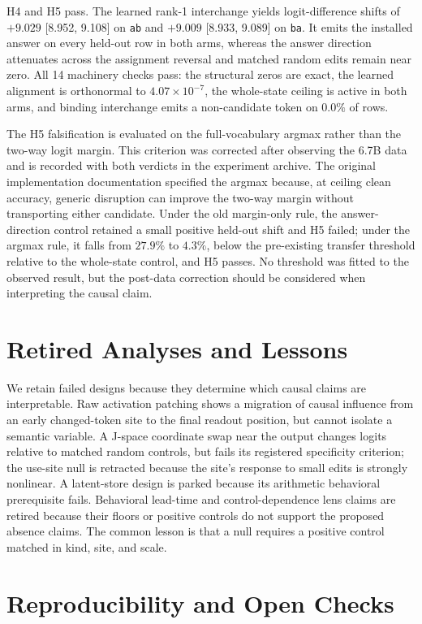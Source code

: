 \documentclass{article}
\begin{document}
H4 and H5 pass. The learned rank-1 interchange yields logit-difference shifts of $+9.029$ [8.952, 9.108] on \texttt{ab} and $+9.009$ [8.933, 9.089] on \texttt{ba}. It emits the installed answer on every held-out row in both arms, whereas the answer direction attenuates across the assignment reversal and matched random edits remain near zero. All 14 machinery checks pass: the structural zeros are exact, the learned alignment is orthonormal to $4.07\times10^{-7}$, the whole-state ceiling is active in both arms, and binding interchange emits a non-candidate token on $0.0\%$ of rows.

The H5 falsification is evaluated on the full-vocabulary argmax rather than the two-way logit margin. This criterion was corrected after observing the 6.7B data and is recorded with both verdicts in the experiment archive. The original implementation documentation specified the argmax because, at ceiling clean accuracy, generic disruption can improve the two-way margin without transporting either candidate. Under the old margin-only rule, the answer-direction control retained a small positive held-out shift and H5 failed; under the argmax rule, it falls from $27.9\%$ to $4.3\%$, below the pre-existing transfer threshold relative to the whole-state control, and H5 passes. No threshold was fitted to the observed result, but the post-data correction should be considered when interpreting the causal claim.

\section{Retired Analyses and Lessons}

We retain failed designs because they determine which causal claims are interpretable. Raw activation patching shows a migration of causal influence from an early changed-token site to the final readout position, but cannot isolate a semantic variable. A J-space coordinate swap near the output changes logits relative to matched random controls, but fails its registered specificity criterion; the use-site null is retracted because the site's response to small edits is strongly nonlinear. A latent-store design is parked because its arithmetic behavioral prerequisite fails. Behavioral lead-time and control-dependence lens claims are retired because their floors or positive controls do not support the proposed absence claims. The common lesson is that a null requires a positive control matched in kind, site, and scale.

\section{Reproducibility and Open Checks}
\end{document}
